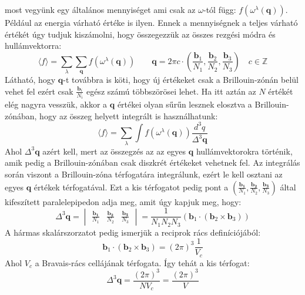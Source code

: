 \documentclass[../main.tex]{subfiles}
\begin{document}
most vegyünk egy általános mennyiséget ami csak az $\omega$-tól függ: $f(\omega^\lambda(\mathbf{q}))$. Például az energia várható értéke is ilyen.
Ennek a mennyiségnek a teljes várható értékét úgy tudjuk kiszámolni, hogy összegezzük az összes rezgési módra és hullámvektorra:
\begin{equation}
    \langle f \rangle = \sum_{\lambda} \sum_{\mathbf{q}} f(\omega^\lambda(\mathbf{q})) \qquad \mathbf{q} = 2\pi c \cdot \left(\frac{\mathbf{b}_1}{N_1}, \frac{\mathbf{b}_2}{N_2}, \frac{\mathbf{b}_3}{N_3}\right) \quad c \in \mathbb{Z}
\end{equation}
Látható, hogy $\mathbf{q}$-t továbbra is köti, hogy új értékeket csak a Brillouin-zónán belül vehet fel ezért csak $\frac{\mathbf{b}_i}{N_i}$ egész számú többszörösei lehet.
Ha itt aztán az $N$ értékét elég nagyra vesszük, akkor a $\mathbf{q}$ értékei olyan sűrűn lesznek elosztva a Brillouin-zónában, hogy az összeg helyett integrált is használhatunk:
\begin{equation}
    \langle f \rangle = \sum_{\lambda} \int f(\omega^\lambda(\mathbf{q})) \frac{d^3 q}{\Delta^3 \mathbf{q}}
\end{equation}
Ahol $\Delta^3 \mathbf{q}$ azért kell, mert az összegzés az az egyes $\mathbf{q}$ hullámvektorokra történik, amik pedig a Brillouin-zónában csak diszkrét értékeket vehetnek fel. Az integrálás során
viszont a Brillouin-zóna térfogatára integrálunk, ezért le kell osztani az egyes $\mathbf{q}$ értékek térfogatával. Ezt a kis térfogatot pedig pont a $\left(\frac{\mathbf{b_1}}{N_1}, \frac{\mathbf{b_2}}{N_2}, \frac{\mathbf{b_3}}{N_3}\right)$
által kifeszített paralelepipedon adja meg, amit úgy kapjuk meg, hogy:
\begin{equation}
    \Delta^3 \mathbf{q} =  \begin{vmatrix}
        \frac{\mathbf{b_1}}{N_1} & \frac{\mathbf{b_2}}{N_2} & \frac{\mathbf{b_3}}{N_3}
    \end{vmatrix} = \frac{1}{N_1 N_2 N_3} \left(\mathbf{b}_1 \cdot (\mathbf{b}_2 \times \mathbf{b}_3) \right)
\end{equation}
A hármas skalárszorzatot pedig ismerjük a reciprok rács definíciójából:
\begin{equation}
    \mathbf{b}_1 \cdot (\mathbf{b}_2 \times \mathbf{b}_3) = (2 \pi)^3 \frac{1}{V_c}
\end{equation}
Ahol $V_c$ a Bravais-rács cellájának térfogata. Így tehát a kis térfogat:
\begin{equation}
    \Delta^3 \mathbf{q} = \frac{(2 \pi)^3}{N V_c} = \frac{(2 \pi)^3}{V}
\end{equation}
\end{document}

